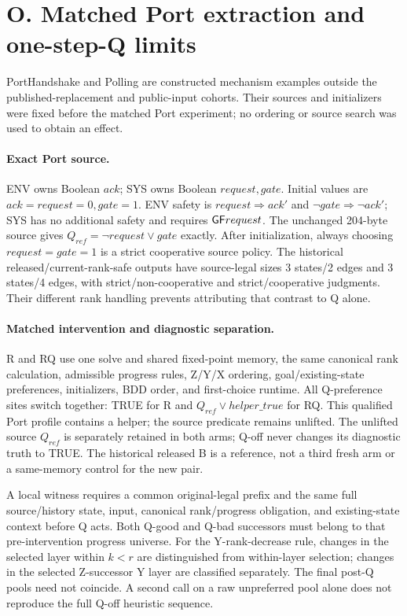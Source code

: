 \section*{O. Matched Port extraction and one-step-Q limits}
\label{app:port-matched}
PortHandshake and Polling are constructed mechanism examples outside
the published-replacement and public-input cohorts. Their sources and
initializers were fixed before the matched Port experiment; no ordering
or source search was used to obtain an effect.

\paragraph{Exact Port source.}
ENV owns Boolean $ack$; SYS owns Boolean $request,gate$.
Initial values are $ack=request=0,gate=1$. ENV safety is
$request\Rightarrow ack'$ and $\neg gate\Rightarrow\neg ack'$;
SYS has no additional safety and requires $\mathsf{G}\mathsf{F} request$.
The unchanged 204-byte source gives
$Q_{ref}=\neg request\lor gate$ exactly. After initialization, always
choosing $request=gate=1$ is a strict cooperative source policy.
The historical released/current-rank-safe outputs have source-legal
sizes 3 states/2 edges and 3 states/4 edges, with strict/non-cooperative
and strict/cooperative judgments. Their different rank handling prevents
attributing that contrast to Q alone.

\paragraph{Matched intervention and diagnostic separation.}
R and RQ use one solve and shared fixed-point memory, the same canonical
rank calculation, admissible progress rules, Z/Y/X ordering,
goal/existing-state preferences, initializers, BDD order, and first-choice
runtime. All Q-preference sites switch together: TRUE for R and
$Q_{ref}\lor helper\_true$ for RQ. This qualified Port profile contains
a helper; the source predicate remains unlifted.
The unlifted source $Q_{ref}$ is separately retained in both arms;
Q-off never changes its diagnostic truth to TRUE.
The historical released B is a reference, not a third fresh arm or a
same-memory control for the new pair.

A local witness requires a common original-legal prefix and the same
full source/history state, input, canonical rank/progress obligation,
and existing-state context before Q acts. Both Q-good and Q-bad successors
must belong to that pre-intervention progress universe. For the
Y-rank-decrease rule, changes in the selected layer within $k<r$ are
distinguished from within-layer selection; changes in the selected
Z-successor Y layer are classified separately. The final post-Q pools
need not coincide. A second
 call on a raw unpreferred pool alone does not reproduce
the full Q-off heuristic sequence.

